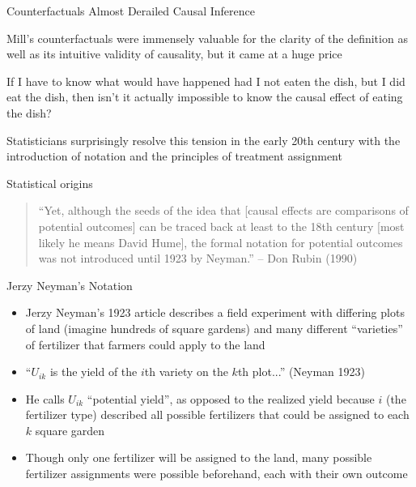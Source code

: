 \documentclass{beamer}
\begin{document}
  
\begin{frame}{Counterfactuals Almost Derailed Causal Inference}



Mill's counterfactuals were immensely valuable for the clarity of the definition as well as its intuitive validity of causality, but it came at a huge price 

\bigskip

If I have to know what would have happened had I not eaten the dish, but I did eat the dish, then isn't it actually impossible to know the causal effect of eating the dish?

\bigskip

Statisticians surprisingly resolve this tension in the early 20th century with the introduction of notation and the principles of treatment assignment


\end{frame}


\begin{frame}{Statistical origins}

\begin{quote}
``Yet, although the seeds of the idea that [causal effects are comparisons of potential outcomes] can be traced back at least to the 18th century [most likely he means David Hume], the formal notation for potential outcomes was not introduced until 1923 by Neyman.'' -- Don Rubin (1990)
\end{quote}

\end{frame}


\begin{frame}{Jerzy Neyman's Notation}

\begin{itemize}
\item Jerzy Neyman's 1923 article describes a field experiment with differing plots of land (imagine hundreds of square gardens) and many different ``varieties'' of fertilizer that farmers could apply to the land
\item ``$U_{ik}$ is the yield of the $i$th variety on the $k$th plot...'' (Neyman 1923)
\item He calls $U_{ik}$ ``potential yield'', as opposed to the realized yield because $i$ (the fertilizer type) described all possible fertilizers that could be assigned to each $k$ square garden
\item Though only one fertilizer will be assigned to the land, many possible fertilizer assignments were possible beforehand, each with their own outcome
\end{itemize}

\end{frame}
\end{document}
